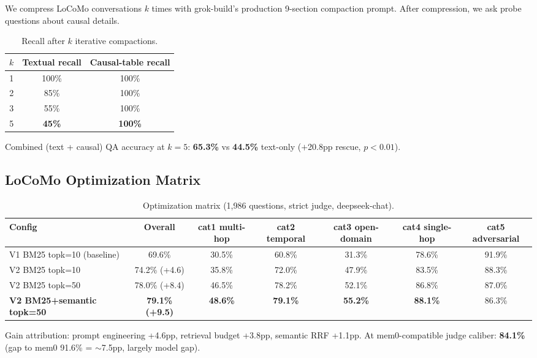 \documentclass[letterpaper,twocolumn,10pt]{article}
\begin{document}
We compress LoCoMo conversations $k$ times with grok-build's production 9-section compaction prompt. After compression, we ask probe questions about causal details.

\begin{table}[ht]
\centering
\small
\caption{Recall after $k$ iterative compactions.}
\label{tab:compaction}
\begin{tabular}{ccc}
\toprule
$k$ & Textual recall & Causal-table recall \\
\midrule
1 & 100\% & 100\% \\
2 & 85\% & 100\% \\
3 & 55\% & 100\% \\
5 & \textbf{45\%} & \textbf{100\%} \\
\bottomrule
\end{tabular}
\end{table}

Combined (text + causal) QA accuracy at $k\!=\!5$: \textbf{65.3\%} vs \textbf{44.5\%} text-only ($+$20.8pp rescue, $p < 0.01$).

\subsection{LoCoMo Optimization Matrix}

\begin{table}[ht]
\centering
\small
\caption{Optimization matrix (1,986 questions, strict judge, deepseek-chat).}
\label{tab:locomo}
\begin{tabular}{lcccccc}
\toprule
Config & Overall & cat1 multi-hop & cat2 temporal & cat3 open-domain & cat4 single-hop & cat5 adversarial \\
\midrule
V1 BM25 topk=10 (baseline) & 69.6\% & 30.5\% & 60.8\% & 31.3\% & 78.6\% & 91.9\% \\
V2 BM25 topk=10 & 74.2\% (+4.6) & 35.8\% & 72.0\% & 47.9\% & 83.5\% & 88.3\% \\
V2 BM25 topk=50 & 78.0\% (+8.4) & 46.5\% & 78.2\% & 52.1\% & 86.8\% & 87.0\% \\
\textbf{V2 BM25+semantic topk=50} & \textbf{79.1\% (+9.5)} & \textbf{48.6\%} & \textbf{79.1\%} & \textbf{55.2\%} & \textbf{88.1\%} & 86.3\% \\
\bottomrule
\end{tabular}
\end{table}

Gain attribution: prompt engineering +4.6pp, retrieval budget +3.8pp, semantic RRF +1.1pp. At mem0-compatible judge caliber: \textbf{84.1\%} (gap to mem0 91.6\% = $\sim$7.5pp, largely model gap).
\end{document}
